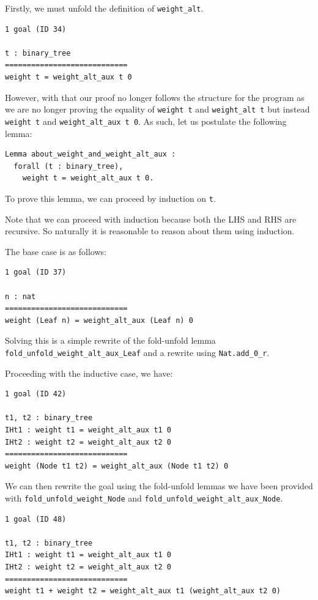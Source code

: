 \documentclass{article}
\begin{document}
Firstly, we must unfold the definition of \texttt{weight\_alt}.

\begin{lstlisting}
1 goal (ID 34)

t : binary_tree
============================
weight t = weight_alt_aux t 0
\end{lstlisting}

However, with that our proof no longer follows the structure for the program as we are no longer proving the equality of \texttt{weight t} and \texttt{weight\_alt t} but instead \texttt{weight t} and \texttt{weight\_alt\_aux t 0}. As such, let us postulate the following lemma:

\begin{lstlisting}
Lemma about_weight_and_weight_alt_aux : 
  forall (t : binary_tree),
    weight t = weight_alt_aux t 0.
\end{lstlisting}

To prove this lemma, we can proceed by induction on \texttt{t}.

Note that we can proceed with induction because both the LHS and RHS are recursive. So naturally it is reasonable to reason about them using induction.

The base case is as follows:

\begin{lstlisting}
1 goal (ID 37)

n : nat
============================
weight (Leaf n) = weight_alt_aux (Leaf n) 0
\end{lstlisting}

Solving this is a simple rewrite of the fold-unfold lemma \texttt{fold\_unfold\_weight\_alt\_aux\_Leaf} and a rewrite using \texttt{Nat.add\_0\_r}.

Proceeding with the inductive case, we have:

\begin{lstlisting}
1 goal (ID 42)

t1, t2 : binary_tree
IHt1 : weight t1 = weight_alt_aux t1 0
IHt2 : weight t2 = weight_alt_aux t2 0
============================
weight (Node t1 t2) = weight_alt_aux (Node t1 t2) 0
\end{lstlisting}

We can then rewrite the goal using the fold-unfold lemmas we have been provided with \texttt{fold\_unfold\_weight\_Node} and \texttt{fold\_unfold\_weight\_alt\_aux\_Node}.

\begin{lstlisting}
1 goal (ID 48)

t1, t2 : binary_tree
IHt1 : weight t1 = weight_alt_aux t1 0
IHt2 : weight t2 = weight_alt_aux t2 0
============================
weight t1 + weight t2 = weight_alt_aux t1 (weight_alt_aux t2 0)
\end{lstlisting}
\end{document}
